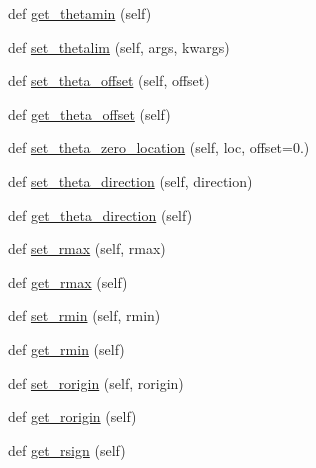 \begin{DoxyCompactItemize}
\item 
def \hyperlink{classmatplotlib_1_1projections_1_1polar_1_1PolarAxes_a28b7c69a34c7fecdd6373239a5d24cf7}{get\+\_\+thetamin} (self)
\item 
def \hyperlink{classmatplotlib_1_1projections_1_1polar_1_1PolarAxes_a414ec44db139075be05e6b908023574e}{set\+\_\+thetalim} (self, args, kwargs)
\item 
def \hyperlink{classmatplotlib_1_1projections_1_1polar_1_1PolarAxes_a1c46d391237e0766e2145f72870e2c76}{set\+\_\+theta\+\_\+offset} (self, offset)
\item 
def \hyperlink{classmatplotlib_1_1projections_1_1polar_1_1PolarAxes_aa8a464e0702879cb527c98adfe4de0c0}{get\+\_\+theta\+\_\+offset} (self)
\item 
def \hyperlink{classmatplotlib_1_1projections_1_1polar_1_1PolarAxes_ad1678cd25fce7844d8ac49da395fb174}{set\+\_\+theta\+\_\+zero\+\_\+location} (self, loc, offset=0.)
\item 
def \hyperlink{classmatplotlib_1_1projections_1_1polar_1_1PolarAxes_a497ca988378796369f0a4e7daa3c96c2}{set\+\_\+theta\+\_\+direction} (self, direction)
\item 
def \hyperlink{classmatplotlib_1_1projections_1_1polar_1_1PolarAxes_ab6e10a0ee62c3a8705176e2add3a29cd}{get\+\_\+theta\+\_\+direction} (self)
\item 
def \hyperlink{classmatplotlib_1_1projections_1_1polar_1_1PolarAxes_a87b18429e115d58dab2151a0a54f2f8d}{set\+\_\+rmax} (self, rmax)
\item 
def \hyperlink{classmatplotlib_1_1projections_1_1polar_1_1PolarAxes_ac6b4c9149ff20e0f8f28da8176f6ea72}{get\+\_\+rmax} (self)
\item 
def \hyperlink{classmatplotlib_1_1projections_1_1polar_1_1PolarAxes_a017bb32e5860d256bd3a65338162c101}{set\+\_\+rmin} (self, rmin)
\item 
def \hyperlink{classmatplotlib_1_1projections_1_1polar_1_1PolarAxes_acb5663a936e18bb0f32ad65243714980}{get\+\_\+rmin} (self)
\item 
def \hyperlink{classmatplotlib_1_1projections_1_1polar_1_1PolarAxes_a905c08f2658a7aa3186de59385fb30fd}{set\+\_\+rorigin} (self, rorigin)
\item 
def \hyperlink{classmatplotlib_1_1projections_1_1polar_1_1PolarAxes_a3afcc60f1d9ebf2d80ff3770a9e403df}{get\+\_\+rorigin} (self)
\item 
def \hyperlink{classmatplotlib_1_1projections_1_1polar_1_1PolarAxes_a7a3e6457a6023ebfc1f76930a8be6cd5}{get\+\_\+rsign} (self)
\item 

\end{DoxyCompactItemize}

